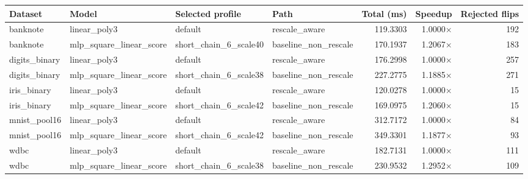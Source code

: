 \begin{tabular}{llllrrr}
\toprule
Dataset & Model & Selected profile & Path & Total (ms) & Speedup & Rejected flips \\
\midrule
banknote & linear\_poly3 & default & rescale\_aware & 119.3303 & 1.0000$\times$ & 192 \\
banknote & mlp\_square\_linear\_score & short\_chain\_6\_scale40 & baseline\_non\_rescale & 170.1937 & 1.2067$\times$ & 183 \\
digits\_binary & linear\_poly3 & default & rescale\_aware & 176.2998 & 1.0000$\times$ & 257 \\
digits\_binary & mlp\_square\_linear\_score & short\_chain\_6\_scale38 & baseline\_non\_rescale & 227.2775 & 1.1885$\times$ & 271 \\
iris\_binary & linear\_poly3 & default & rescale\_aware & 120.0278 & 1.0000$\times$ & 15 \\
iris\_binary & mlp\_square\_linear\_score & short\_chain\_6\_scale42 & baseline\_non\_rescale & 169.0975 & 1.2060$\times$ & 15 \\
mnist\_pool16 & linear\_poly3 & default & rescale\_aware & 312.7172 & 1.0000$\times$ & 84 \\
mnist\_pool16 & mlp\_square\_linear\_score & short\_chain\_6\_scale42 & baseline\_non\_rescale & 349.3301 & 1.1877$\times$ & 93 \\
wdbc & linear\_poly3 & default & rescale\_aware & 182.7131 & 1.0000$\times$ & 111 \\
wdbc & mlp\_square\_linear\_score & short\_chain\_6\_scale38 & baseline\_non\_rescale & 230.9532 & 1.2952$\times$ & 109 \\
\bottomrule
\end{tabular}
